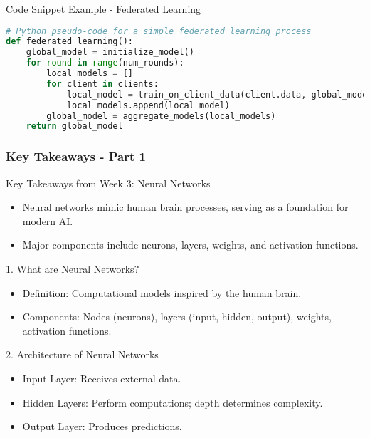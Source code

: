 \documentclass[aspectratio=169]{beamer}
\begin{document}
\begin{frame}[fragile]{Code Snippet Example - Federated Learning}
\begin{lstlisting}[language=Python]
# Python pseudo-code for a simple federated learning process
def federated_learning():
    global_model = initialize_model()
    for round in range(num_rounds):
        local_models = []
        for client in clients:
            local_model = train_on_client_data(client.data, global_model)
            local_models.append(local_model)
        global_model = aggregate_models(local_models)
    return global_model
\end{lstlisting}
\end{frame}

\begin{frame}[fragile]
    \frametitle{Key Takeaways - Part 1}
    \begin{block}{Key Takeaways from Week 3: Neural Networks}
        \begin{itemize}
            \item Neural networks mimic human brain processes, serving as a foundation for modern AI.
            \item Major components include neurons, layers, weights, and activation functions.
        \end{itemize}
    \end{block}
    
    \begin{block}{1. What are Neural Networks?}
        \begin{itemize}
            \item Definition: Computational models inspired by the human brain.
            \item Components: Nodes (neurons), layers (input, hidden, output), weights, activation functions.
        \end{itemize}
    \end{block}
    
    \begin{block}{2. Architecture of Neural Networks}
        \begin{itemize}
            \item Input Layer: Receives external data.
            \item Hidden Layers: Perform computations; depth determines complexity.
            \item Output Layer: Produces predictions.
        \end{itemize}
    \end{block}
\end{frame}
\end{document}
